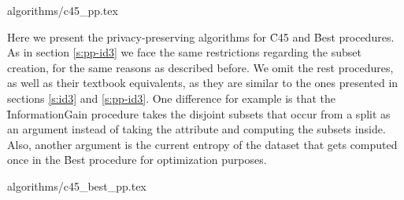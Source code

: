 {algorithms/c45_pp.tex}





Here we present the privacy\hyp preserving algorithms for \f{C45} and \f{Best} procedures.
As in section \ref{s:pp-id3} we face the same restrictions regarding the subset creation, for the same reasons as described before.
We omit the rest procedures, as well as their textbook equivalents, as they are similar to the ones presented in sections \ref{s:id3} and \ref{s:pp-id3}.
One difference for example is that the \f{InformationGain} procedure takes the disjoint subsets that occur from a split as an argument instead of taking the attribute and computing the subsets inside.
Also, another argument is the current entropy of the dataset that gets computed once in the \f{Best} procedure for optimization purposes.

{algorithms/c45_best_pp.tex}
